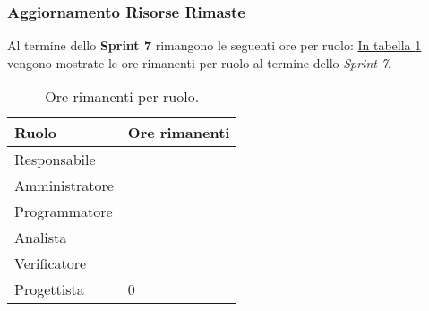 \subsubsection{Aggiornamento Risorse Rimaste}
\label{sec:AggiornamentoRisorse_Sprint7}
Al termine dello \textbf{Sprint 7} rimangono le seguenti ore per ruolo: \hyperref[tab:sprint7_ore_rimanenti]{In tabella \ref{tab:sprint7_ore_rimanenti}} vengono mostrate le ore rimanenti per ruolo al termine dello \textit{Sprint 7}.

\begin{table}[H]
    \centering
    \begin{tabular}{| l | l |}
    \hline
    \textbf{Ruolo} & 
    \textbf{Ore rimanenti}\\
    \hline
        Responsabile & \\
    \hline
        Amministratore & \\
    \hline
        Programmatore & \\
    \hline
        Analista & \\
    \hline
        Verificatore & \\
    \hline
        Progettista & 0\\
    \hline
    \end{tabular}
    \caption{Ore rimanenti per ruolo.}
    \label{tab:sprint7_ore_rimanenti} 
\end{table}